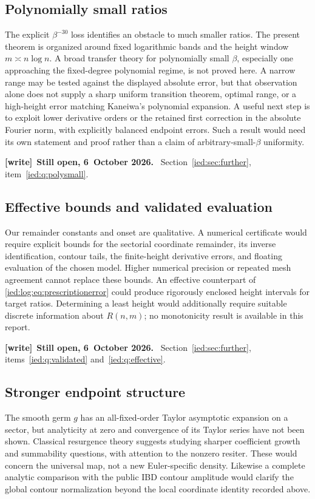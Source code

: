 \documentclass[11pt,letterpaper]{article}
\theoremstyle{remark}\newtheorem{remark}[theorem]{Remark}
\newenvironment{writenote}[1][]{\par\smallskip\begingroup\small
 \noindent\textbf{[write]}\if\relax\detokenize{#1}\relax\else~\textbf{#1.}\fi\ }%
 {\par\endgroup\smallskip}
\begin{document}
\subsection{Polynomially small ratios}\label{ied:log:sub:polysmall}
The explicit $\beta^{-30}$ loss identifies an obstacle to much smaller ratios. The present theorem is organized around fixed logarithmic bands and the height window $m\asymp n\log n$. A broad transfer theory for polynomially small $\beta$, especially one approaching the fixed-degree polynomial regime, is not proved here. A narrow range may be tested against the displayed absolute error, but that observation alone does not supply a sharp uniform transition theorem, optimal range, or a high-height error matching Kaneiwa's polynomial expansion. A useful next step is to exploit lower derivative orders or the retained first correction in the absolute Fourier norm, with explicitly balanced endpoint errors. Such a result would need its own statement and proof rather than a claim of arbitrary-small-$\beta$ uniformity.

\begin{writenote}[Still open, 6~October 2026]
Section~\ref{ied:sec:further}, item~\ref{ied:q:polysmall}.
\end{writenote}

\subsection{Effective bounds and validated evaluation}\label{ied:log:sub:effective}
Our remainder constants and onset are qualitative. A numerical certificate would require explicit bounds for the sectorial coordinate remainder, its inverse identification, contour tails, the finite-height derivative errors, and floating evaluation of the chosen model. Higher numerical precision or repeated mesh agreement cannot replace these bounds. An effective counterpart of \eqref{ied:log:eq:prescriptionerror} could produce rigorously enclosed height intervals for target ratios. Determining a least height would additionally require suitable discrete information about $R(n,m)$; no monotonicity result is available in this report.

\begin{writenote}[Still open, 6~October 2026]
Section~\ref{ied:sec:further}, items~\ref{ied:q:validated} and~\ref{ied:q:effective}.
\end{writenote}

\subsection{Stronger endpoint structure}\label{ied:log:sub:endpoint}
The smooth germ $g$ has an all-fixed-order Taylor asymptotic expansion on a sector, but analyticity at zero and convergence of its Taylor series have not been shown. Classical resurgence theory suggests studying sharper coefficient growth and summability questions, with attention to the nonzero resiter. These would concern the universal map, not a new Euler-specific density. Likewise a complete analytic comparison with the public IBD contour amplitude would clarify the global contour normalization beyond the local coordinate identity recorded above.
\end{document}
